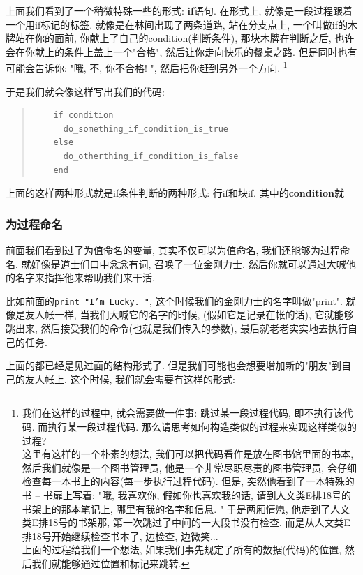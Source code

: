 上面我们看到了一个稍微特殊一些的形式: \textbf{if}语句. 在形式上, 就像是一段过程跟着一个用if标记的标签. 就像是在林间出现了两条道路, 站在分支点上, 一个叫做if的木牌站在你的面前, 你献上了自己的condition(判断条件), 那块木牌在判断之后, 也许会在你献上的条件上盖上一个"合格", 然后让你走向快乐的餐桌之路. 但是同时也有可能会告诉你: "哦, 不, 你不合格! ", 然后把你赶到另外一个方向. \footnote{我们在这样的过程中, 就会需要做一件事: 跳过某一段过程代码, 即不执行该代码. 而执行某一段过程代码. 那么请思考如何构造类似的过程来实现这样类似的过程? \\ 这里有这样的一个朴素的想法, 我们可以把代码看作是放在图书馆里面的书本, 然后我们就像是一个图书管理员, 他是一个非常尽职尽责的图书管理员, 会仔细检查每一本书上的内容(每一步执行过程代码). 但是, 突然他看到了一本特殊的书 -- 书扉上写着: "哦, 我喜欢你, 假如你也喜欢我的话, 请到人文类E排18号的书架上的那本笔记上, 哪里有我的名字和信息. " 于是两厢情愿, 他走到了人文类E排18号的书架那, 第一次跳过了中间的一大段书没有检查. 而是从人文类E排18号开始继续检查书本了, 边检查, 边微笑... \\ 上面的过程给我们一个想法, 如果我们事先规定了所有的数据(代码)的位置, 然后我们就能够通过位置和标记来跳转. }

于是我们就会像这样写出我们的代码: 

\begin{quotation}
  \begin{verbatim}
    if condition
      do_something_if_condition_is_true
    else
      do_otherthing_if_condition_is_false
    end
  \end{verbatim}
\end{quotation}

上面的这样两种形式就是if条件判断的两种形式: 行if和块if. 其中的\textbf{condition}就

\subsubsection*{为过程命名}
前面我们看到过了为值命名的变量, 其实不仅可以为值命名, 我们还能够为过程命名. 就好像是道士们口中念念有词, 召唤了一位金刚力士. 然后你就可以通过大喊他的名字来指挥他来帮助我们来干活. 

比如前面的\texttt{print "I'm Lucky. "}, 这个时候我们的金刚力士的名字叫做"print". 就像是友人帐一样, 当我们大喊它的名字的时候, (假如它是记录在帐的话), 它就能够跳出来, 然后接受我们的命令(也就是我们传入的参数), 最后就老老实实地去执行自己的任务. 

上面的都已经是见过面的结构形式了. 但是我们可能也会想要增加新的"朋友"到自己的友人帐上. 这个时候, 我们就会需要有这样的形式: 

